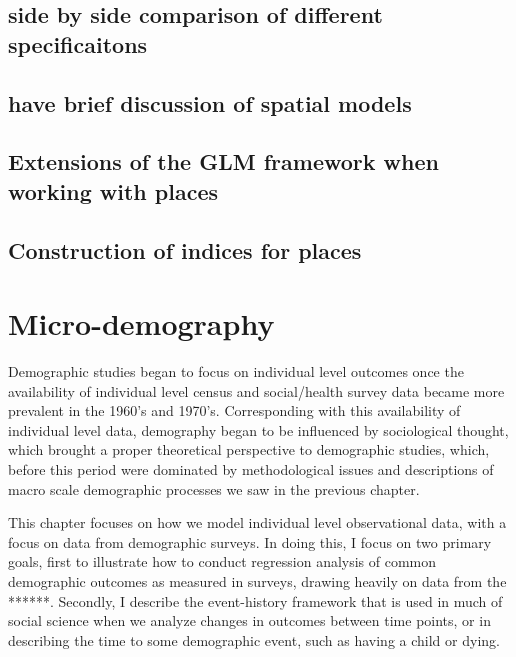 \documentclass[
]{article}
\begin{document}
\hypertarget{side-by-side-comparison-of-different-specificaitons}{%
\subsection{side by side comparison of different specificaitons}\label{side-by-side-comparison-of-different-specificaitons}}

\hypertarget{have-brief-discussion-of-spatial-models}{%
\subsection{have brief discussion of spatial models}\label{have-brief-discussion-of-spatial-models}}

\hypertarget{extensions-of-the-glm-framework-when-working-with-places}{%
\subsection{Extensions of the GLM framework when working with places}\label{extensions-of-the-glm-framework-when-working-with-places}}

\hypertarget{construction-of-indices-for-places}{%
\subsection{Construction of indices for places}\label{construction-of-indices-for-places}}

\newpage

\hypertarget{micro-demography}{%
\section{Micro-demography}\label{micro-demography}}

Demographic studies began to focus on individual level outcomes once the availability of individual level census and social/health survey data became more prevalent in the 1960's and 1970's. Corresponding with this availability of individual level data, demography began to be influenced by sociological thought, which brought a proper theoretical perspective to demographic studies, which, before this period were dominated by methodological issues and descriptions of macro scale demographic processes we saw in the previous chapter.

This chapter focuses on how we model individual level observational data, with a focus on data from demographic surveys. In doing this, I focus on two primary goals, first to illustrate how to conduct regression analysis of common demographic outcomes as measured in surveys, drawing heavily on data from the ******. Secondly, I describe the event-history framework that is used in much of social science when we analyze changes in outcomes between time points, or in describing the time to some demographic event, such as having a child or dying.
\end{document}
